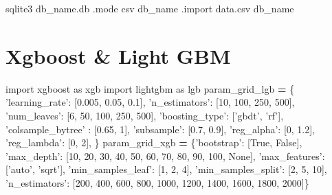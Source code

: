 \documentclass[]{book}
\newenvironment{Shaded}{\begin{snugshade}}{\end{snugshade}}
\newcommand{\DecValTok}[1]{\textcolor[rgb]{0.00,0.00,0.81}{#1}}
\newcommand{\ExtensionTok}[1]{#1}
\newcommand{\FloatTok}[1]{\textcolor[rgb]{0.00,0.00,0.81}{#1}}
\newcommand{\ImportTok}[1]{#1}
\newcommand{\NormalTok}[1]{#1}
\newcommand{\OperatorTok}[1]{\textcolor[rgb]{0.81,0.36,0.00}{\textbf{#1}}}
\newcommand{\StringTok}[1]{\textcolor[rgb]{0.31,0.60,0.02}{#1}}
\newcommand{\VariableTok}[1]{\textcolor[rgb]{0.00,0.00,0.00}{#1}}
\begin{document}
\begin{Shaded}
\begin{Highlighting}[]
\ExtensionTok{sqlite3}\NormalTok{ db_name.db}
\ExtensionTok{.mode}\NormalTok{ csv db_name}
\ExtensionTok{.import}\NormalTok{ data.csv db_name}
\end{Highlighting}
\end{Shaded}

\hypertarget{xgboost-light-gbm}{%
\section{Xgboost \& Light GBM}\label{xgboost-light-gbm}}

\begin{Shaded}
\begin{Highlighting}[]
\ImportTok{import}\NormalTok{ xgboost }\ImportTok{as}\NormalTok{ xgb}
\ImportTok{import}\NormalTok{ lightgbm }\ImportTok{as}\NormalTok{ lgb}
\NormalTok{param_grid_lgb }\OperatorTok{=}\NormalTok{ \{}
    \StringTok{'learning_rate'}\NormalTok{: [}\FloatTok{0.005}\NormalTok{, }\FloatTok{0.05}\NormalTok{, }\FloatTok{0.1}\NormalTok{], }\StringTok{'n_estimators'}\NormalTok{: [}\DecValTok{10}\NormalTok{, }\DecValTok{100}\NormalTok{, }\DecValTok{250}\NormalTok{, }\DecValTok{500}\NormalTok{],}
    \StringTok{'num_leaves'}\NormalTok{: [}\DecValTok{6}\NormalTok{, }\DecValTok{50}\NormalTok{, }\DecValTok{100}\NormalTok{, }\DecValTok{250}\NormalTok{, }\DecValTok{500}\NormalTok{], }\StringTok{'boosting_type'}\NormalTok{: [}\StringTok{'gbdt'}\NormalTok{, }\StringTok{'rf'}\NormalTok{],}
    \StringTok{'colsample_bytree'}\NormalTok{ : [}\FloatTok{0.65}\NormalTok{, }\DecValTok{1}\NormalTok{], }\StringTok{'subsample'}\NormalTok{: [}\FloatTok{0.7}\NormalTok{, }\FloatTok{0.9}\NormalTok{],}
    \StringTok{'reg_alpha'}\NormalTok{: [}\DecValTok{0}\NormalTok{, }\FloatTok{1.2}\NormalTok{], }\StringTok{'reg_lambda'}\NormalTok{: [}\DecValTok{0}\NormalTok{, }\DecValTok{2}\NormalTok{],}
\NormalTok{    \}}
\NormalTok{param_grid_xgb }\OperatorTok{=}\NormalTok{ \{}\StringTok{'bootstrap'}\NormalTok{: [}\VariableTok{True}\NormalTok{, }\VariableTok{False}\NormalTok{],}
 \StringTok{'max_depth'}\NormalTok{: [}\DecValTok{10}\NormalTok{, }\DecValTok{20}\NormalTok{, }\DecValTok{30}\NormalTok{, }\DecValTok{40}\NormalTok{, }\DecValTok{50}\NormalTok{, }\DecValTok{60}\NormalTok{, }\DecValTok{70}\NormalTok{, }\DecValTok{80}\NormalTok{, }\DecValTok{90}\NormalTok{, }\DecValTok{100}\NormalTok{, }\VariableTok{None}\NormalTok{],}
 \StringTok{'max_features'}\NormalTok{: [}\StringTok{'auto'}\NormalTok{, }\StringTok{'sqrt'}\NormalTok{],}
 \StringTok{'min_samples_leaf'}\NormalTok{: [}\DecValTok{1}\NormalTok{, }\DecValTok{2}\NormalTok{, }\DecValTok{4}\NormalTok{],}
 \StringTok{'min_samples_split'}\NormalTok{: [}\DecValTok{2}\NormalTok{, }\DecValTok{5}\NormalTok{, }\DecValTok{10}\NormalTok{],}
 \StringTok{'n_estimators'}\NormalTok{: [}\DecValTok{200}\NormalTok{, }\DecValTok{400}\NormalTok{, }\DecValTok{600}\NormalTok{, }\DecValTok{800}\NormalTok{, }\DecValTok{1000}\NormalTok{, }\DecValTok{1200}\NormalTok{, }\DecValTok{1400}\NormalTok{, }\DecValTok{1600}\NormalTok{, }\DecValTok{1800}\NormalTok{, }\DecValTok{2000}\NormalTok{]\}}
\end{Highlighting}
\end{Shaded}
\end{document}

